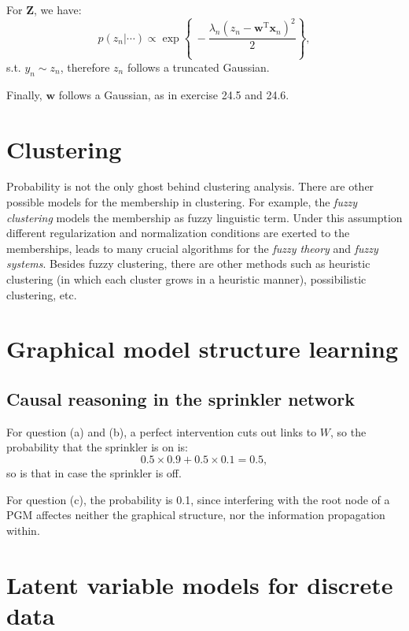 \documentclass[UTF8]{ctexart}
\begin{document}
For $\textbf{Z}$, we have:
$$p(z_{n}|\cdots)\propto \exp\left\{\ -\frac{\lambda_{n}(z_{n}-\textbf{w}^{\text{T}}\textbf{x}_{n})^{2}}{2}\right\},$$
s.t. $y_{n}\sim z_{n}$, therefore $z_{n}$ follows a truncated Gaussian.

Finally, $\textbf{w}$ follows a Gaussian, as in exercise 24.5 and 24.6. 



\newpage
\section{Clustering}
Probability is not the only ghost behind clustering analysis.
There are other possible models for the membership in clustering. 
For example, the \emph{fuzzy clustering} models the membership as fuzzy linguistic term. 
Under this assumption different regularization and normalization conditions are exerted to the memberships, leads to many crucial algorithms for the \emph{fuzzy theory} and \emph{fuzzy systems}.
Besides fuzzy clustering, there are other methods such as heuristic clustering (in which each cluster grows in a heuristic manner), possibilistic clustering, etc.

\newpage
\section{Graphical model structure learning}
\subsection{Causal reasoning in the sprinkler network}
For question (a) and (b), a perfect intervention cuts out links to $W$, so the probability that the sprinkler is on is:
$$0.5\times 0.9+0.5\times 0.1=0.5,$$
so is that in case the sprinkler is off.

For question (c), the probability is 0.1, since interfering with the root node of a PGM affectes neither the graphical structure, nor the information propagation within. 

\newpage
\section{Latent variable models for discrete data}
\end{document}
